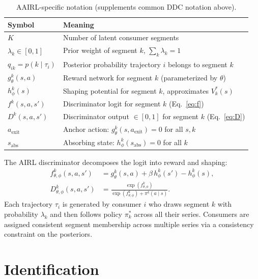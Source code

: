 \documentclass[11pt]{article}
\begin{document}
\begin{table}[H]
\centering\small
\caption{AAIRL-specific notation (supplements common DDC notation above).}
\label{tab:aairl_notation}
\begin{tabular}{ll}
\toprule
Symbol & Meaning \\
\midrule
$K$ & Number of latent consumer segments \\
$\lambda_k \in [0,1]$ & Prior weight of segment $k$, $\sum_k \lambda_k = 1$ \\
$q_{ik} = p(k \mid \tau_i)$ & Posterior probability trajectory $i$ belongs to segment $k$ \\
$g_\theta^k(s,a)$ & Reward network for segment $k$ (parameterized by $\theta$) \\
$h_\phi^k(s)$ & Shaping potential for segment $k$, approximates $V^*_k(s)$ \\
$f^k(s,a,s')$ & Discriminator logit for segment $k$ (Eq.~\ref{eq:f}) \\
$D^k(s,a,s')$ & Discriminator output $\in [0,1]$ for segment $k$ (Eq.~\ref{eq:D}) \\
$a_{\text{exit}}$ & Anchor action: $g_\theta^k(s, a_{\text{exit}}) = 0$ for all $s, k$ \\
$s_{\text{abs}}$ & Absorbing state: $h_\phi^k(s_{\text{abs}}) = 0$ for all $k$ \\
\bottomrule
\end{tabular}
\end{table}
\FloatBarrier

The AIRL discriminator decomposes the logit into reward and shaping:
\begin{align}
f^k_{\theta,\phi}(s,a,s') &= g_\theta^k(s,a) + \beta\, h_\phi^k(s') - h_\phi^k(s), \label{eq:f}\\[3pt]
D^k_{\theta,\phi}(s,a,s') &= \frac{\exp(f^k_{\theta,\phi})}{\exp(f^k_{\theta,\phi}) + \pi^k(a \mid s)}. \label{eq:D}
\end{align}
Each trajectory $\tau_i$ is generated by consumer $i$ who draws segment $k$ with probability $\lambda_k$ and then follows policy $\pi^*_k$ across all their series. Consumers are assigned consistent segment membership across multiple series via a consistency constraint on the posteriors.

\section{Identification}
\end{document}
